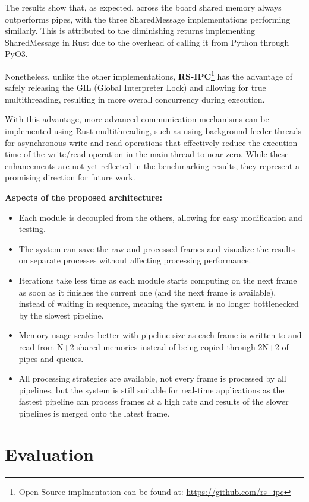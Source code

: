 \documentclass[conference]{IEEEtran}
\begin{document}
The results show that, as expected, across the board shared memory always outperforms pipes, with the three SharedMessage implementations performing similarly.
This is attributed to the diminishing returns implementing SharedMessage in Rust due to the overhead of calling it from Python through PyO3.

Nonetheless, unlike the other implementations, \textbf{RS-IPC}\footnote{Open Source implmentation can be found at: \href{https://github.com/TheLuckyCoder/rs\_ipc}{https://github.com/rs\_ipc}} has the advantage of safely releasing the GIL (Global Interpreter Lock) and allowing for true multithreading, resulting in more overall concurrency during execution.

With this advantage, more advanced communication mechanisms can be implemented using Rust multithreading, such as using background feeder threads for asynchronous write and read operations that effectively reduce the execution time of the write/read operation in the main thread to near zero.
While these enhancements are not yet reflected in the benchmarking results, they represent a promising direction for future work.


\textbf{Aspects of the proposed architecture:}
\begin{itemize}
    \item Each module is decoupled from the others, allowing for easy modification and testing.
    \item The system can save the raw and processed frames and visualize the results on separate processes without affecting processing performance.
    \item Iterations take less time as each module starts computing on the next frame as soon as it finishes the current one (and the next frame is available), instead of waiting in sequence, meaning the system is no longer bottlenecked by the slowest pipeline.
    \item Memory usage scales better with pipeline size as each frame is written to and read from N+2 shared memories instead of being copied through 2N+2 of pipes and queues.
    \item All processing strategies are available, not every frame is processed by all pipelines, but the system is still suitable for real-time applications as the fastest pipeline can process frames at a high rate and results of the slower pipelines is merged onto the latest frame.
\end{itemize}

\section{Evaluation}
\end{document}
